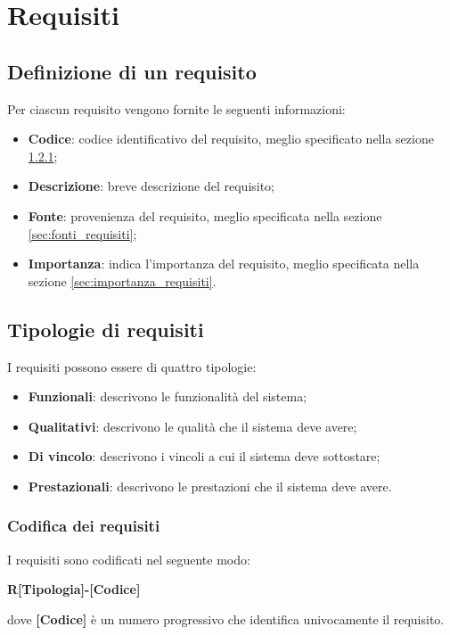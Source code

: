 \section{Requisiti}
\subsection{Definizione di un requisito}
Per ciascun requisito vengono fornite le seguenti informazioni:
\begin{itemize}
	\item \textbf{Codice}: codice identificativo del requisito, meglio specificato nella sezione \ref{sec:codifica_requisiti};
	\item \textbf{Descrizione}: breve descrizione del requisito;
	\item \textbf{Fonte}: provenienza del requisito, meglio specificata nella sezione \ref{sec:fonti_requisiti};
	\item \textbf{Importanza}: indica l'importanza del requisito, meglio specificata nella sezione \ref{sec:importanza_requisiti}.
\end{itemize}

\subsection{Tipologie di requisiti}
I requisiti possono essere di quattro tipologie:
\begin{itemize}
	\item \textbf{Funzionali}: descrivono le funzionalità del sistema;
	\item \textbf{Qualitativi}: descrivono le qualità che il sistema deve avere;
	\item \textbf{Di vincolo}: descrivono i vincoli a cui il sistema deve sottostare;
	\item \textbf{Prestazionali}: descrivono le prestazioni che il sistema deve avere.
\end{itemize}

\subsubsection{Codifica dei requisiti}
\label{sec:codifica_requisiti}
I requisiti sono codificati nel seguente modo:
\begin{center}
	\textbf{R[Tipologia]-[Codice]}
\end{center}
dove \textbf{[Codice]} è un numero progressivo che identifica univocamente il requisito.


